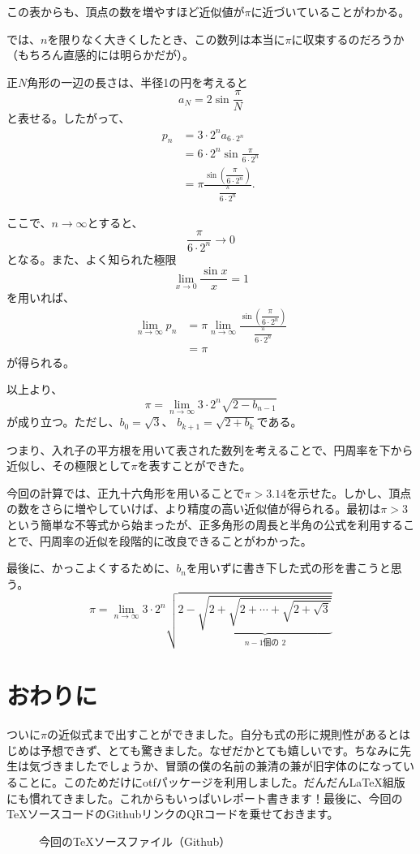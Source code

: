 \documentclass[dvipdfmx]{jlreq}
\begin{document}
この表からも、頂点の数を増やすほど近似値が$\pi$に近づいていることがわかる。

では、$n$を限りなく大きくしたとき、この数列は本当に$\pi$に収束するのだろうか（もちろん直感的には明らかだが）。

正$N$角形の一辺の長さは、半径1の円を考えると
\[
a_N=2\sin\frac{\pi}{N}
\]
と表せる。したがって、
\[
\begin{aligned}
p_n
&=3\cdot 2^n a_{6\cdot 2^n}\\
&=6\cdot 2^n
\sin\frac{\pi}{6\cdot 2^n}\\
&=\pi\frac{
\sin\left(\dfrac{\pi}{6\cdot 2^n}\right)
}{
\dfrac{\pi}{6\cdot 2^n}
}.
\end{aligned}
\]

ここで、$n\to\infty$とすると、
\[ \frac{\pi}{6\cdot 2^n}\to 0 \]
となる。また、よく知られた極限
\[ \lim_{x\to 0}\frac{\sin x}{x}=1 \]
を用いれば、
\[
\begin{aligned}
\lim_{n\to\infty}p_n
&=\pi\lim_{n\to\infty}
\frac{
\sin\left(\dfrac{\pi}{6\cdot 2^n}\right)
}{
\dfrac{\pi}{6\cdot 2^n}
}\\
&=\pi
\end{aligned}
\]
が得られる。

以上より、
\[
\boxed{
\pi=\lim_{n\to\infty}
3\cdot 2^n\sqrt{2-b_{n-1}}
}
\]
が成り立つ。ただし、$b_0=\sqrt{3}$、
$b_{k+1}=\sqrt{2+b_k}$である。

つまり、入れ子の平方根を用いて表された数列を考えることで、円周率を下から近似し、その極限として$\pi$を表すことができた。

今回の計算では、正九十六角形を用いることで$\pi>3.14$を示せた。しかし、頂点の数をさらに増やしていけば、より精度の高い近似値が得られる。最初は$\pi>3$という簡単な不等式から始まったが、正多角形の周長と半角の公式を利用することで、円周率の近似を段階的に改良できることがわかった。

最後に、かっこよくするために、$b_n$を用いずに書き下した式の形を書こうと思う。
\[
\boxed{
\pi=\lim_{n\to\infty}
3\cdot 2^n
\sqrt{
2-\underbrace{
\sqrt{2+\sqrt{2+\cdots+\sqrt{2+\sqrt{3}}}}
}_{n-1\text{個の }2}
}
}
\]
\section{おわりに}
ついに$\pi$の近似式まで出すことができました。自分も式の形に規則性があるとはじめは予想できず、とても驚きました。なぜだかとても嬉しいです。ちなみに先生は気づきましたでしょうか、冒頭の僕の名前の兼清の兼が旧字体のになっていることに。このためだけにotfパッケージを利用しました。だんだんLaTeX組版にも慣れてきました。これからもいっぱいレポート書きます！最後に、今回のTeXソースコードのGithubリンクのQRコードを乗せておきます。
\begin{figure}[htbp]
  \centering
  \vspace{1cm}
  \caption*{今回の\TeX ソースファイル（Github）}
\end{figure}
\end{document}
